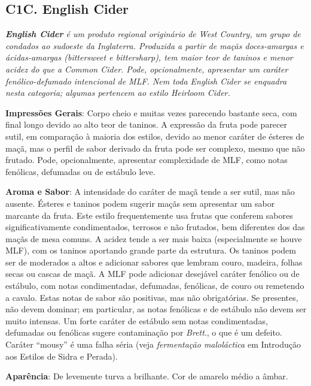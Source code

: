 \subsection*{C1C. English Cider}

\textit{\textbf{English Cider} é um produto regional originário de West Country, um grupo de condados ao sudoeste da Inglaterra. Produzida a partir de maçãs doces-amargas e ácidas-amargas (\textit{bittersweet} e \textit{bittersharp}), tem maior teor de taninos e menor acidez do que a Common Cider. Pode, opcionalmente, apresentar um caráter fenólico-defumado intencional de MLF. Nem toda English Cider se enquadra nesta categoria; algumas pertencem ao estilo Heirloom Cider.}

\textbf{Impressões Gerais}: Corpo cheio e muitas vezes parecendo bastante seca, com final longo devido ao alto teor de taninos. A expressão da fruta pode parecer sutil, em comparação à maioria dos estilos, devido ao menor caráter de ésteres de maçã, mas o perfil de sabor derivado da fruta pode ser complexo, mesmo que não frutado. Pode, opcionalmente, apresentar complexidade de MLF, como notas fenólicas, defumadas ou de estábulo leve.

\textbf{Aroma e Sabor}: A intensidade do caráter de maçã tende a ser sutil, mas não ausente. Ésteres e taninos podem sugerir maçãs sem apresentar um sabor marcante da fruta. Este estilo frequentemente usa frutas que conferem sabores significativamente condimentados, terrosos e não frutados, bem diferentes dos das maçãs de mesa comuns. A acidez tende a ser mais baixa (especialmente se houve MLF), com os taninos aportando grande parte da estrutura. Os taninos podem ser de moderados a altos e adicionar sabores que lembram couro, madeira, folhas secas ou cascas de maçã. A MLF pode adicionar desejável caráter fenólico ou de estábulo, com notas condimentadas, defumadas, fenólicas, de couro ou remetendo a cavalo. Estas notas de sabor são positivas, mas não obrigatórias. Se presentes, não devem dominar; em particular, as notas fenólicas e de estábulo não devem ser muito intensas. Um forte caráter de estábulo sem notas condimentadas, defumadas ou fenólicas sugere contaminação por \textit{Brett}., o que é um defeito. Caráter “mousy” é uma falha séria (veja \textit{fermentação maloláctica} em Introdução aos Estilos de Sidra e Perada).

\textbf{Aparência}: De levemente turva a brilhante. Cor de amarelo médio a âmbar.

